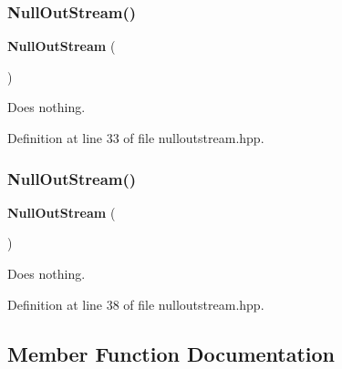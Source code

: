 \subsubsection{Null\+Out\+Stream()\hspace{0.1cm}{\footnotesize\ttfamily [1/2]}}
{\footnotesize\ttfamily \textbf{ Null\+Out\+Stream} (\begin{DoxyParamCaption}{ }\end{DoxyParamCaption})\hspace{0.3cm}{\ttfamily [inline]}}



Does nothing. 



Definition at line 33 of file nulloutstream.\+hpp.

\mbox{\label{classmlpack_1_1util_1_1NullOutStream_ad7795db3553036d2eec8dc911cdc1df9}} 
\subsubsection{Null\+Out\+Stream()\hspace{0.1cm}{\footnotesize\ttfamily [2/2]}}
{\footnotesize\ttfamily \textbf{ Null\+Out\+Stream} (\begin{DoxyParamCaption}\item[{const \textbf{ Null\+Out\+Stream} \&}]{ }\end{DoxyParamCaption})\hspace{0.3cm}{\ttfamily [inline]}}



Does nothing. 



Definition at line 38 of file nulloutstream.\+hpp.



\subsection{Member Function Documentation}
\mbox{\label{classmlpack_1_1util_1_1NullOutStream_adfee12075905260e79b586643cbbeeb8}} 
